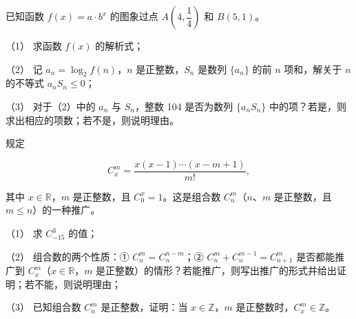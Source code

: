 \begin{question}
已知函数 $f(x)=a\cdot b^x$ 的图象过点 $A(4,\dfrac14)$ 和 $B(5,1)$。

（1） 求函数 $f(x)$ 的解析式；

（2） 记 $a_n=\log_2f(n)$，$n$ 是正整数，$S_n$ 是数列 $\{a_n\}$ 的前 $n$ 项和，解关于 $n$ 的不等式 $a_nS_n\le0$；

（3） 对于（2）中的 $a_n$ 与 $S_n$，整数 104 是否为数列 $\{a_nS_n\}$ 中的项？若是，则求出相应的项数；若不是，则说明理由。

\end{question}
\begin{question}
规定

\nopagebreak[4]
\[
C_x^m=\frac{x(x-1)\cdots(x-m+1)}{m!},
\]

其中 $x\in\mathbb R$，$m$ 是正整数，且 $C_0^x=1$。这是组合数 $C_n^m$（$n\text{、}m$ 是正整数，且 $m\le n$）的一种推广。

（1） 求 $C_{-15}^3$ 的值；

（2） 组合数的两个性质：① $C_n^m=C_n^{n-m}$；② $C_n^m+C_n^{m-1}=C_{n+1}^m$ 是否都能推广到 $C_x^m$（$x\in\mathbb R$，$m$ 是正整数）的情形？若能推广，则写出推广的形式并给出证明；若不能，则说明理由；

（3） 已知组合数 $C_n^m$ 是正整数，证明：当 $x\in\mathbb Z$，$m$ 是正整数时，$C_x^m\in\mathbb Z$。

\end{question}